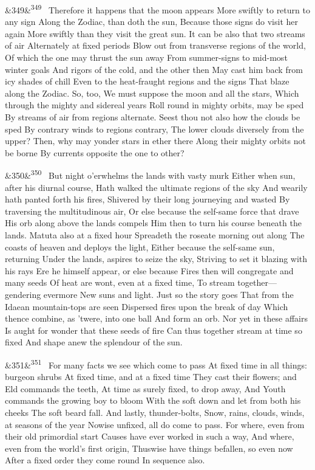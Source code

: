 \documentclass[12pt]{article}
\newcommand{\para}[1][]{\par\noindent\ifx&#1&\else\textsuperscript{\footnotesize #1}~\fi}
\begin{document}
\para[349] Therefore it happens that the moon appears More swiftly to return to any sign Along the Zodiac, than doth the sun, Because those signs do visit her again More swiftly than they visit the great sun. It can be also that two streams of air Alternately at fixed periods Blow out from transverse regions of the world, Of which the one may thrust the sun away From summer-signs to mid-most winter goals And rigors of the cold, and the other then May cast him back from icy shades of chill Even to the heat-fraught regions and the signs That blaze along the Zodiac. So, too, We must suppose the moon and all the stars, Which through the mighty and sidereal years Roll round in mighty orbits, may be sped By streams of air from regions alternate. Seest thou not also how the clouds be sped By contrary winds to regions contrary, The lower clouds diversely from the upper? Then, why may yonder stars in ether there Along their mighty orbits not be borne By currents opposite the one to other?

\para[350] But night o'erwhelms the lands with vasty murk Either when sun, after his diurnal course, Hath walked the ultimate regions of the sky And wearily hath panted forth his fires, Shivered by their long journeying and wasted By traversing the multitudinous air, Or else because the self-same force that drave His orb along above the lands compels Him then to turn his course beneath the lands. Matuta also at a fixed hour Spreadeth the roseate morning out along The coasts of heaven and deploys the light, Either because the self-same sun, returning Under the lands, aspires to seize the sky, Striving to set it blazing with his rays Ere he himself appear, or else because Fires then will congregate and many seeds Of heat are wont, even at a fixed time, To stream together---gendering evermore New suns and light. Just so the story goes That from the Idaean mountain-tops are seen Dispersed fires upon the break of day Which thence combine, as 'twere, into one ball And form an orb. Nor yet in these affairs Is aught for wonder that these seeds of fire Can thus together stream at time so fixed And shape anew the splendour of the sun.

\para[351] For many facts we see which come to pass At fixed time in all things: burgeon shrubs At fixed time, and at a fixed time They cast their flowers; and Eld commands the teeth, At time as surely fixed, to drop away, And Youth commands the growing boy to bloom With the soft down and let from both his cheeks The soft beard fall. And lastly, thunder-bolts, Snow, rains, clouds, winds, at seasons of the year Nowise unfixed, all do come to pass. For where, even from their old primordial start Causes have ever worked in such a way, And where, even from the world's first origin, Thuswise have things befallen, so even now After a fixed order they come round In sequence also.
\end{document}

